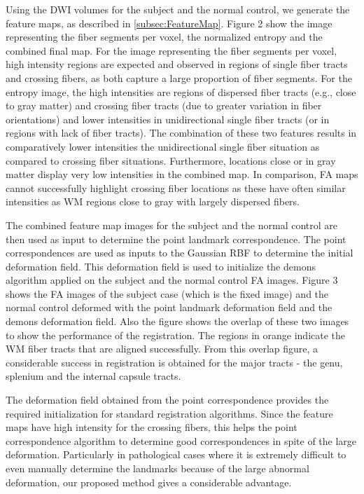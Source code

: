 \documentclass[]{spie}  %
\begin{document}
Using the DWI volumes for the subject and the normal control, we generate the feature maps, as described in \ref{subsec:FeatureMap}. Figure 2 show the image representing the fiber segments per voxel, the normalized entropy and the combined final map. For the image representing the fiber segments per voxel,  high intensity regions are expected and observed in regions of single fiber tracts and crossing fibers, as both capture a large proportion of fiber segments. For the entropy image, the high intensities are regions of dispersed fiber tracts (e.g., close to gray matter) and crossing fiber tracts (due to greater variation in fiber orientations) and lower intensities in unidirectional single fiber tracts (or in regions with lack of fiber tracts). The combination of  these two features results in comparatively lower intensities the unidirectional single fiber situation as compared to crossing fiber situations. Furthermore, locations close or in gray matter display very low intensities in the combined map.  In comparison, FA maps cannot successfully highlight crossing fiber locations as these have often similar intensities as WM regions close to gray with largely dispersed fibers.

The combined feature map images for the subject and the normal control are then used as input to determine the point landmark correspondence. The point correspondences are used as inputs to the Gaussian RBF to determine the initial deformation field. This deformation field is used to initialize the demons algorithm applied on the subject and the normal control FA images. Figure 3 shows the FA images of the subject case (which is the fixed image) and the normal control deformed with the point landmark deformation field and the demons deformation field. Also the figure shows the overlap of these two images to show the performance of the registration. The regions in orange indicate the WM fiber tracts that are aligned successfully. From this overlap figure, a considerable success in registration is obtained for the major tracts - the genu, splenium and the internal capsule tracts.

The deformation field obtained from the point correspondence provides the required initialization for standard registration algorithms. Since the feature maps have high intensity for the crossing fibers, this helps the point correspondence algorithm to determine good correspondences in spite of the large deformation. Particularly in pathological cases where it is extremely difficult to even manually determine the landmarks because of the large abnormal deformation, our proposed method gives a considerable advantage.
\end{document}
